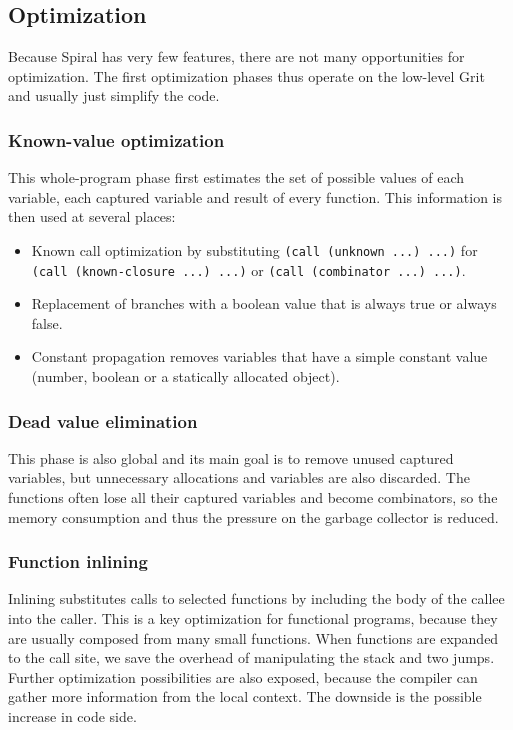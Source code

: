 \subsection{Optimization}

Because Spiral has very few features, there are not many opportunities for
optimization. The first optimization phases thus operate on the low-level Grit
and usually just simplify the code.

\subsubsection{Known-value optimization}

This whole-program phase first estimates the set of possible values of each
variable, each captured variable and result of every function. This information
is then used at several places:

\begin{itemize}
  \item Known call optimization by substituting \texttt{(call (unknown ...)
    ...)} for \texttt{(call (known-closure ...) ...)} or \texttt{(call
    (combinator ...) ...)}.
  \item Replacement of branches with a boolean value that is always true or
    always false.
  \item Constant propagation removes variables that have a simple constant value
    (number, boolean or a statically allocated object).
\end{itemize}

\subsubsection{Dead value elimination}

This phase is also global and its main goal is to remove unused captured
variables, but unnecessary allocations and variables are also discarded. The
functions often lose all their captured variables and become combinators, so
the memory consumption and thus the pressure on the garbage collector is
reduced.

\subsubsection{Function inlining}

Inlining substitutes calls to selected functions by including the body of the
callee into the caller. This is a key optimization for functional programs,
because they are usually composed from many small functions. When functions are
expanded to the call site, we save the overhead of manipulating the stack and
two jumps. Further optimization possibilities are also exposed, because the
compiler can gather more information from the local context. The downside is the
possible increase in code side.

